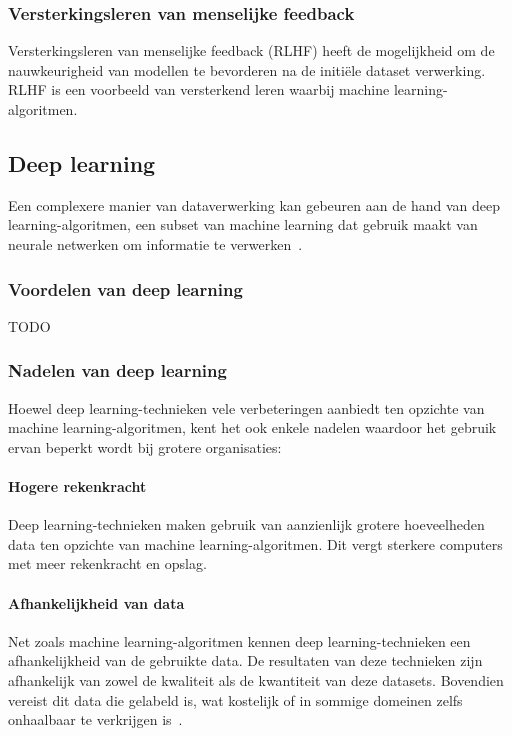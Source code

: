 \subsubsection{Versterkingsleren van menselijke feedback}
Versterkingsleren van menselijke feedback (RLHF) heeft de mogelijkheid om de nauwkeurigheid van modellen te bevorderen na de initi\"ele dataset verwerking.
RLHF is een voorbeeld van versterkend leren waarbij machine learning-algoritmen.

\subsection{Deep learning}
\label{subsec:deep-learning-algoritmen}
Een complexere manier van dataverwerking kan gebeuren aan de hand van deep learning-algoritmen, een subset van machine learning dat gebruik maakt van neurale netwerken om informatie te verwerken~\autocite{Bozic2024}.

\subsubsection{Voordelen van deep learning}
TODO %

\subsubsection{Nadelen van deep learning}
Hoewel deep learning-technieken vele verbeteringen aanbiedt ten opzichte van machine learning-algoritmen, kent het ook enkele nadelen waardoor het gebruik ervan beperkt wordt bij grotere organisaties:

\paragraph{Hogere rekenkracht}
Deep learning-technieken maken gebruik van aanzienlijk grotere hoeveelheden data ten opzichte van machine learning-algoritmen.
Dit vergt sterkere computers met meer rekenkracht en opslag.
\paragraph{Afhankelijkheid van data}
Net zoals machine learning-algoritmen kennen deep learning-technieken een afhankelijkheid van de gebruikte data.
De resultaten van deze technieken zijn afhankelijk van zowel de kwaliteit als de kwantiteit van deze datasets.
Bovendien vereist dit data die gelabeld is, wat kostelijk of in sommige domeinen zelfs onhaalbaar te verkrijgen is~\autocite{Olaoye2024a}.
